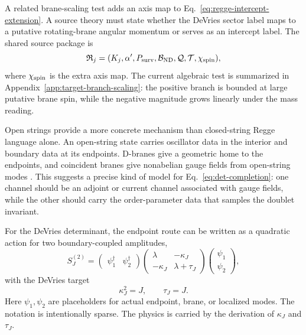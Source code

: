 A related brane-scaling test adds an axis map to
Eq.~\eqref{eq:regge-intercept-extension}.  A source theory must state whether
the DeVries sector label maps to a putative rotating-brane angular momentum or
serves as an intercept label.  The shared source package is
\[
  \mathfrak R_j=
  (K_j,\alpha',P_{\rm surv},\mathcal B_{\rm ND},
  \mathcal Q,\mathcal T,\chi_{\rm spin}),
\]
where \(\chi_{\rm spin}\) is the extra axis map.  The current algebraic test is
summarized in Appendix~\ref{app:target-branch-scaling}: the positive branch is
bounded at large putative brane spin, while the negative magnitude grows
linearly under the mass reading.

Open strings provide a more concrete mechanism than closed-string Regge language alone.  An open-string state carries oscillator data in the interior and boundary data at its endpoints.  D-branes give a geometric home to the endpoints, and coincident branes give nonabelian gauge fields from open-string modes \cite{Polchinski1994,TongString}.  This suggests a precise kind of model for Eq.~\eqref{eq:det-completion}: one channel should be an adjoint or current channel associated with gauge fields, while the other should carry the order-parameter data that samples the doublet invariant.

For the DeVries determinant, the endpoint route can be written as a quadratic action for two boundary-coupled amplitudes,
\begin{equation}
  S^{(2)}_J =
  \begin{pmatrix}\psi_1^\dagger & \psi_2^\dagger\end{pmatrix}
  \begin{pmatrix}
    \lambda & -\kappa_J\\
    -\kappa_J & \lambda+\tau_J
  \end{pmatrix}
  \begin{pmatrix}\psi_1\\ \psi_2\end{pmatrix},
  \label{eq:endpoint-quadratic}
\end{equation}
with the DeVries target
\begin{equation}
  \kappa_J^2=J,\qquad \tau_J=J.
  \label{eq:endpoint-target}
\end{equation}
Here \(\psi_1,\psi_2\) are placeholders for actual endpoint, brane, or localized modes.  The notation is intentionally sparse.  The physics is carried by the derivation of \(\kappa_J\) and \(\tau_J\).

